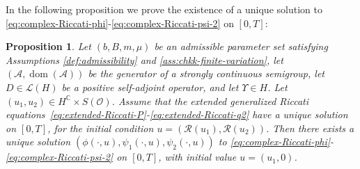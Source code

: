 \documentclass[10pt,a4paper,reqno]{amsart}
\DeclareMathOperator\dom{dom}
\numberwithin{equation}{section}
\newtheorem{proposition}[theorem]{Proposition}
\theoremstyle{plain}
\theoremstyle{definition}
\theoremstyle{example}
\newcommand{\cA}{\mathcal{A}}
\newcommand{\cL}{\mathcal{L}}
\newcommand{\cO}{\mathcal{O}}
\newcommand{\cR}{\mathcal{R}}
\begin{document}
In the following proposition we prove the existence of a unique solution to \eqref{eq:complex-Riccati-phi}-\eqref{eq:complex-Riccati-psi-2} on $[0,T]$:
\begin{proposition}\label{prop:existence-complex-solution}
Let $(b,B,m,\mu)$ be an admissible parameter set satisfying Assumptions \ref{def:admissibility} and \ref{ass:chkk-finite-variation},
let $(\cA,\dom(\cA))$ be the generator of a strongly continuous semigroup, let $D \in
\cL(H)$ be a positive self-adjoint operator, and let $\Upsilon \in H$. Let $(u_1, u_2) \in H^\mathbb{C} \times S(\cO)$. Assume that the
extended generalized Riccati
equations~\eqref{eq:extended-Riccati-P}-\eqref{eq:extended-Riccati-q2} have
a unique solution on $[0,T]$, for the initial condition \sloppy $u= (\cR (u_1),\cR (u_2))$. Then there exists a unique
solution $(\phi(\cdot,u), \psi_1(\cdot,u), \psi_2(\cdot,u))$ to
\eqref{eq:complex-Riccati-phi}-\eqref{eq:complex-Riccati-psi-2} on $[0,T]$, with initial value $u=(u_1,0)$.     
\end{proposition}
\end{document}
